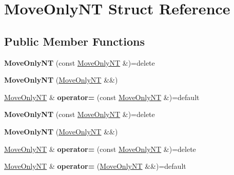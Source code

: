 \hypertarget{struct_move_only_n_t}{}\section{Move\+Only\+NT Struct Reference}
\label{struct_move_only_n_t}
\subsection*{Public Member Functions}
\begin{DoxyCompactItemize}
\item 
\mbox{\label{struct_move_only_n_t_a0d882fffac1b41efd8d011671b826ab7}} 
{\bfseries Move\+Only\+NT} (const \mbox{\hyperlink{struct_move_only_n_t}{Move\+Only\+NT}} \&)=delete
\item 
\mbox{\label{struct_move_only_n_t_a7d213f30337754780884a62e86896e3b}} 
{\bfseries Move\+Only\+NT} (\mbox{\hyperlink{struct_move_only_n_t}{Move\+Only\+NT}} \&\&)
\item 
\mbox{\label{struct_move_only_n_t_af7d43535a9dac71d967044855f893300}} 
\mbox{\hyperlink{struct_move_only_n_t}{Move\+Only\+NT}} \& {\bfseries operator=} (const \mbox{\hyperlink{struct_move_only_n_t}{Move\+Only\+NT}} \&)=default
\item 
\mbox{\label{struct_move_only_n_t_a0d882fffac1b41efd8d011671b826ab7}} 
{\bfseries Move\+Only\+NT} (const \mbox{\hyperlink{struct_move_only_n_t}{Move\+Only\+NT}} \&)=delete
\item 
\mbox{\label{struct_move_only_n_t_a7d213f30337754780884a62e86896e3b}} 
{\bfseries Move\+Only\+NT} (\mbox{\hyperlink{struct_move_only_n_t}{Move\+Only\+NT}} \&\&)
\item 
\mbox{\label{struct_move_only_n_t_a6adbfe1bd30cae394d22767300cf48c1}} 
\mbox{\hyperlink{struct_move_only_n_t}{Move\+Only\+NT}} \& {\bfseries operator=} (const \mbox{\hyperlink{struct_move_only_n_t}{Move\+Only\+NT}} \&)=delete
\item 
\mbox{\label{struct_move_only_n_t_a97241c7d878b0ec92322006930ec8123}} 
\mbox{\hyperlink{struct_move_only_n_t}{Move\+Only\+NT}} \& {\bfseries operator=} (\mbox{\hyperlink{struct_move_only_n_t}{Move\+Only\+NT}} \&\&)=default

\end{DoxyCompactItemize}
